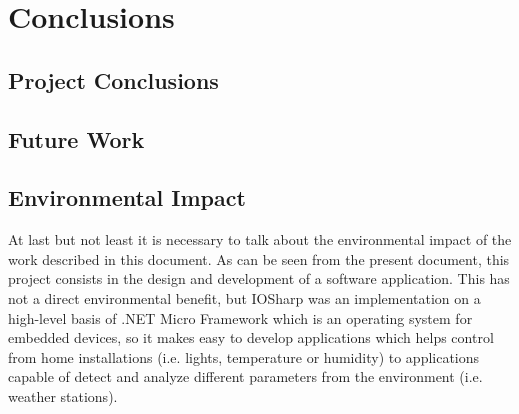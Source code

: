 \chapter{Conclusions}\label{C:Conclusions}
\section{Project Conclusions}\label{S:Project-Conclusions}
\section{Future Work}\label{S:Future-Work}
\section{Environmental Impact}\label{S:Environmental-Impact}
At last but not least it is necessary to talk about the environmental impact of the work
described in this document. As can be seen from the present document, this project
consists in the design and development of a software application. This has not a direct
environmental benefit, but IOSharp was an implementation on a high-level basis of .NET Micro Framework which is an operating system for embedded devices, so it makes easy to develop applications which helps control from home installations (i.e. lights, temperature or humidity) to applications capable of detect and analyze different parameters from the environment (i.e. weather stations).